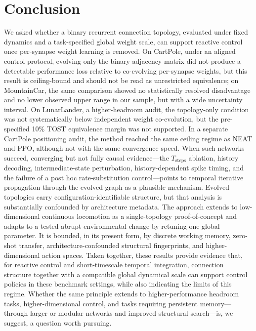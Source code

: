 \documentclass[10pt]{article}
\begin{document}
\section{Conclusion}

We asked whether a binary recurrent connection topology, evaluated under fixed
dynamics and a task-specified global weight scale, can support reactive control
once per-synapse weight learning is removed. On CartPole, under an aligned
control protocol, evolving only the binary adjacency matrix did not produce a
detectable performance loss relative to co-evolving per-synapse weights, but
this result is ceiling-bound and should not be read as unrestricted equivalence;
on MountainCar, the same comparison showed no statistically resolved
disadvantage and no lower observed upper range in our sample, but with a wide
uncertainty interval. On LunarLander, a higher-headroom audit, the
topology-only condition was not systematically below independent weight
co-evolution, but the pre-specified 10\% TOST equivalence margin was not
supported. In a separate CartPole positioning audit, the method reached the same
ceiling regime as NEAT and PPO, although not with the same convergence speed.
When such networks succeed, converging but not fully causal evidence---the
$T_\text{steps}$ ablation, history decoding, intermediate-state perturbation,
history-dependent spike timing, and the failure of a post hoc rate-substitution
control---points to temporal iterative propagation through the evolved graph as
a plausible mechanism. Evolved topologies carry configuration-identifiable
structure, but that analysis is substantially confounded by architecture
metadata. The approach extends to low-dimensional continuous locomotion as a
single-topology proof-of-concept and adapts to a tested abrupt environmental
change by retuning one global parameter. It is bounded, in its present form, by
discrete working memory, zero-shot transfer, architecture-confounded structural
fingerprints, and higher-dimensional action spaces. Taken together, these
results provide evidence that, for reactive control and short-timescale temporal
integration, connection structure together with a compatible global dynamical
scale can support control policies in these benchmark settings, while also
indicating the limits of this regime. Whether the same principle extends to
higher-performance headroom tasks, higher-dimensional control, and tasks
requiring persistent memory---through larger or modular networks and improved
structural search---is, we suggest, a question worth pursuing.
\end{document}
